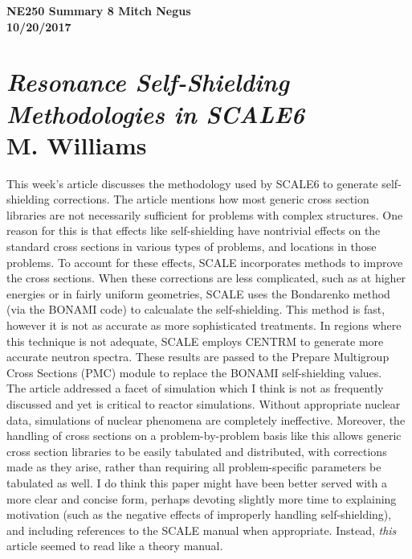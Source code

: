 \documentclass{report}
\newcommand{\tab}{\-\hspace{1cm}}
\begin{document}
\thispagestyle{empty}

{\bf {\large {NE250 Summary {8} \hfill Mitch Negus\\
		\hspace*{\fill} 10/20/2017\\ }}}
\section*{\textsl{Resonance Self-Shielding Methodologies in SCALE6} \\ \normalsize M. Williams}

\tab This week's article discusses the methodology used by SCALE6 to generate self-shielding corrections. The article mentions how most generic cross section libraries are not necessarily sufficient for problems with complex structures. One reason for this is that effects like self-shielding have nontrivial effects on the standard cross sections in various types of problems, and locations in those problems. To account for these effects, SCALE incorporates methods to improve the cross sections. When these corrections are less complicated, such as at higher energies or in fairly uniform geometries, SCALE uses the Bondarenko method (via the BONAMI code) to calcualate the self-shielding. This method is fast, however it is not as accurate as more sophisticated treatments. In regions where this technique is not adequate, SCALE employs CENTRM to generate more accurate neutron spectra. These results are passed to the Prepare Multigroup Cross Sections (PMC) module to replace the BONAMI self-shielding values.\\
\tab The article addressed a facet of simulation which I think is not as frequently discussed and yet is critical to reactor simulations. Without appropriate nuclear data, simulations of nuclear phenomena are completely ineffective. Moreover, the handling of cross sections on a problem-by-problem basis like this allows generic cross section libraries to be easily tabulated and distributed, with corrections made as they arise, rather than requiring all problem-specific parameters be tabulated as well. I do think this paper might have been better served with a more clear and concise form, perhaps devoting slightly more time to explaining motivation (such as the negative effects of improperly handling self-shielding), and including references to the SCALE manual when appropriate. Instead, \textit{this} article seemed to read like a theory manual.
\end{document}

